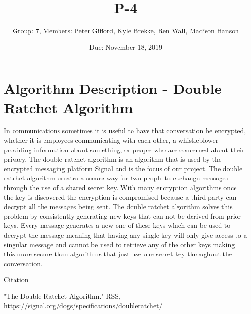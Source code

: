 \documentclass{article}
\title{P-4}
\author{Group: 7, Members: Peter Gifford, Kyle Brekke, Ren Wall, Madison Hanson}
\date{Due: November 18, 2019}
\begin{document}
\maketitle

\section{Algorithm Description - Double Ratchet Algorithm}

In communications sometimes it is useful to have that conversation be encrypted, whether it is employees communicating with each other, a whistleblower providing information about something, or people who are concerned about their privacy. The double ratchet algorithm is an algorithm that is used by the encrypted messaging platform Signal and is the focus of our project. The double ratchet algorithm creates a secure way for two people to exchange messages through the use of a shared secret key. With many encryption algorithms once the key is discovered the encryption is compromised because a third party can decrypt all the messages being sent. The double ratchet algorithm solves this problem by consistently generating new keys that can not be derived from prior keys. Every message generates a new one of these keys which can be used to decrypt the message meaning that having any single key will only give access to a singular message and cannot be used to retrieve any of the other keys making this more secure than algorithms that just use one secret key throughout the conversation. 




    
Citation

"The Double Ratchet Algorithm." RSS, https://signal.org/dogs/specifications/doubleratchet/


    
	
	    
\end{document}
